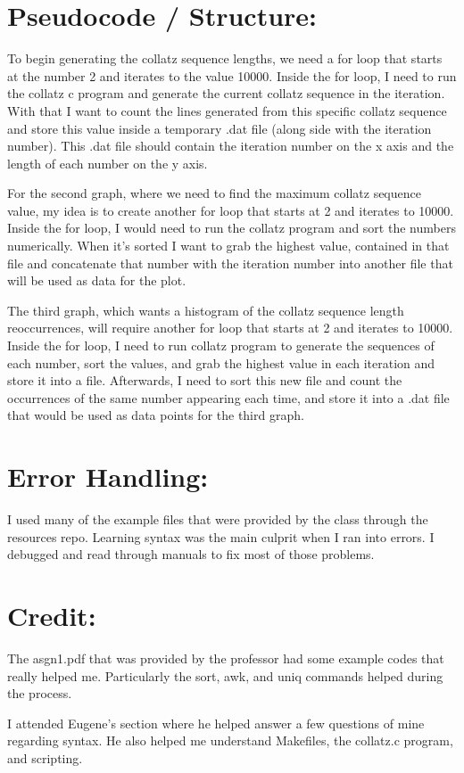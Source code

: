 \documentclass[11pt]{article}
\begin{document}
\section{Pseudocode / Structure:}

To begin generating the collatz sequence lengths, we need a for loop that starts at the number 
2 and iterates to the value 10000. Inside the for loop, I need to run the collatz c program 
and generate the current collatz sequence in the iteration. With that I want to count the lines 
generated from this specific collatz sequence and store this value inside a temporary .dat file 
(along side with the iteration number). This .dat file should contain the iteration number on 
the x axis and the length of each number on the y axis.

\noindent For the second graph, where we need to find the maximum collatz sequence value, my idea
is to create another for loop that starts at 2 and iterates to 10000. Inside the for loop, I would 
need to run the collatz program and sort the numbers numerically. When it's sorted I want to grab 
the highest value, contained in that file and concatenate that number with the iteration number 
into another file that will be used as data for the plot.

\noindent The third graph, which wants a histogram of the collatz sequence length reoccurrences, 
will require another for loop that starts at 2 and iterates to 10000. Inside the for loop, I need 
to run collatz program to generate the sequences of each number, sort the values, and grab the 
highest value in each iteration and store it into a file. Afterwards, I need to sort this new file 
and count the occurrences of the same number appearing each time, and store it into a .dat file that would be used as data points for the third graph.

\section{Error Handling:}

I used many of the example files that were provided by the class through the resources repo. 
Learning syntax was the main culprit when I ran into errors. I debugged and read through manuals 
to fix most of those problems.

\section{Credit:}

The asgn1.pdf that was provided by the professor had some example codes that really helped me. 
Particularly the sort, awk, and uniq commands helped during the process.

\noindent I attended Eugene's section where he helped answer a few questions of mine regarding 
syntax. He also helped me understand Makefiles, the collatz.c program, and scripting. 
\end{document}
